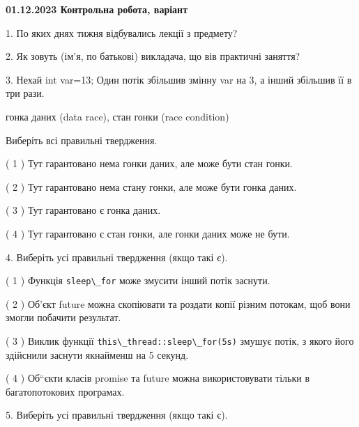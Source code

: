 \documentclass[12pt, ukrainian]{article}
\def\code#1{\Verb!#1!}
\begin{document}
\vspace{4mm}
\newpage
\begin {large}

\textbf{01.12.2023 Контрольна робота, варіант  }\par


{
1. По яких днях тижня відбувались лекції з предмету?



\vspace{5mm}
2. Як зовуть (ім'я, по батькові) викладача, що вів практичні заняття?



\vspace{5mm}
3. Нехай int var=13; Один потік збільшив змінну var на 3, а інший збільшив її в три рази.

гонка даних (data race), стан гонки (race condition)

Виберіть всі правильні твердження.\par
\vspace{2mm}
( 1 ) Тут гарантовано нема гонки даних, але може бути стан гонки.%

( 2 ) Тут гарантовано нема стану гонки, але може бути гонка даних.%

( 3 ) Тут гарантовано є гонка даних.%

( 4 ) Тут гарантовано є стан гонки, але гонки даних може не бути.%


\vspace{5mm}
4. Виберіть усі правильні твердження (якщо такі є).\par
\vspace{2mm}

( 1 ) Функція \code{sleep\_for} може змусити інший потік заснути.%

( 2 ) Об’єкт future можна скопіювати та роздати копії різним потокам, щоб вони змогли побачити результат.%

( 3 ) Виклик функції \code{this\_thread::sleep\_for(5s)} змушує потік, з якого його здійснили заснути якнайменш на 5 секунд.%

( 4 ) Об“єкти класів promise та future можна використовувати тільки в багатопотокових програмах.%


\vspace{5mm}
5. Виберіть усі правильні твердження (якщо такі є).\par
\vspace{2mm}

}
\end{large}
\end{document}
